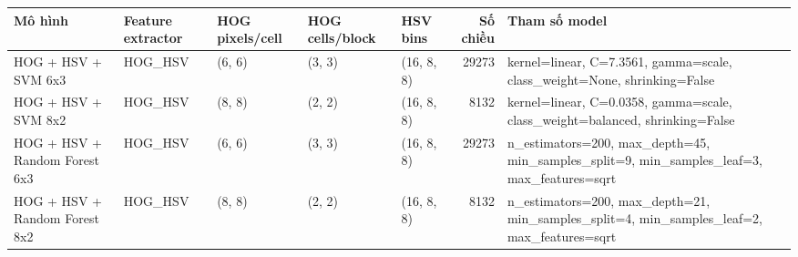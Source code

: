 \begin{tabular}{lllllrl}
\toprule
Mô hình & Feature extractor & HOG pixels/cell & HOG cells/block & HSV bins & Số chiều & Tham số model \\
\midrule
HOG + HSV + SVM 6x3 & HOG_HSV & (6, 6) & (3, 3) & (16, 8, 8) & 29273 & kernel=linear, C=7.3561, gamma=scale, class_weight=None, shrinking=False \\
HOG + HSV + SVM 8x2 & HOG_HSV & (8, 8) & (2, 2) & (16, 8, 8) & 8132 & kernel=linear, C=0.0358, gamma=scale, class_weight=balanced, shrinking=False \\
HOG + HSV + Random Forest 6x3 & HOG_HSV & (6, 6) & (3, 3) & (16, 8, 8) & 29273 & n_estimators=200, max_depth=45, min_samples_split=9, min_samples_leaf=3, max_features=sqrt \\
HOG + HSV + Random Forest 8x2 & HOG_HSV & (8, 8) & (2, 2) & (16, 8, 8) & 8132 & n_estimators=200, max_depth=21, min_samples_split=4, min_samples_leaf=2, max_features=sqrt \\
\bottomrule
\end{tabular}
